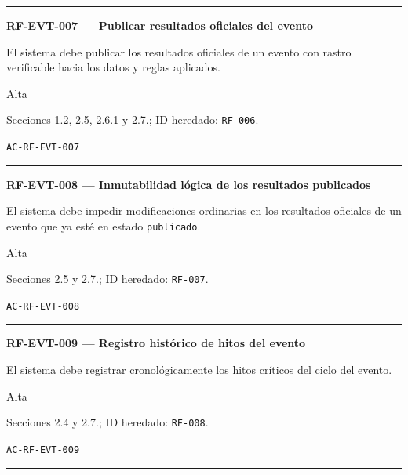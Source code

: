\documentclass[10pt,letterpaper]{article}
\begin{document}
\vspace{0.25em}\hrule\vspace{0.65em}
\noindent\textbf{RF-EVT-007 --- Publicar resultados oficiales del evento}\par
\begin{description}[style=nextline,leftmargin=3.15cm,labelwidth=2.8cm,font=\normalfont\bfseries]
\item[Obligación] El sistema debe publicar los resultados oficiales de un evento con rastro verificable hacia los datos y reglas aplicados.
\item[Prioridad] Alta
\item[Procedencia] Secciones 1.2, 2.5, 2.6.1 y 2.7.; ID heredado: \texttt{RF-006}.
\item[Verificación] \texttt{AC-RF-EVT-007}
\end{description}
\vspace{0.25em}\hrule\vspace{0.65em}
\noindent\textbf{RF-EVT-008 --- Inmutabilidad lógica de los resultados publicados}\par
\begin{description}[style=nextline,leftmargin=3.15cm,labelwidth=2.8cm,font=\normalfont\bfseries]
\item[Obligación] El sistema debe impedir modificaciones ordinarias en los resultados oficiales de un evento que ya esté en estado \texttt{publicado}.
\item[Prioridad] Alta
\item[Procedencia] Secciones 2.5 y 2.7.; ID heredado: \texttt{RF-007}.
\item[Verificación] \texttt{AC-RF-EVT-008}
\end{description}
\vspace{0.25em}\hrule\vspace{0.65em}
\noindent\textbf{RF-EVT-009 --- Registro histórico de hitos del evento}\par
\begin{description}[style=nextline,leftmargin=3.15cm,labelwidth=2.8cm,font=\normalfont\bfseries]
\item[Obligación] El sistema debe registrar cronológicamente los hitos críticos del ciclo del evento.
\item[Prioridad] Alta
\item[Procedencia] Secciones 2.4 y 2.7.; ID heredado: \texttt{RF-008}.
\item[Verificación] \texttt{AC-RF-EVT-009}
\end{description}
\vspace{0.25em}\hrule\vspace{0.65em}
\end{document}
